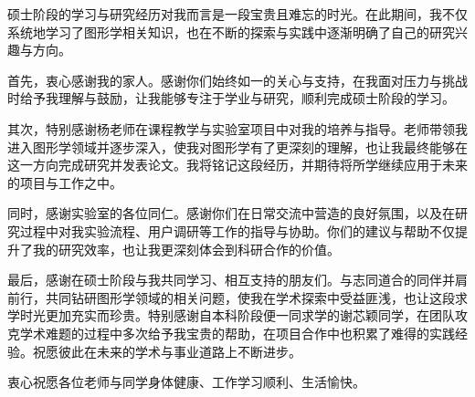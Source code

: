 
\begin{acknowledgements}
硕士阶段的学习与研究经历对我而言是一段宝贵且难忘的时光。在此期间，我不仅系统地学习了图形学相关知识，也在不断的探索与实践中逐渐明确了自己的研究兴趣与方向。

首先，衷心感谢我的家人。感谢你们始终如一的关心与支持，在我面对压力与挑战时给予我理解与鼓励，让我能够专注于学业与研究，顺利完成硕士阶段的学习。

其次，特别感谢杨老师在课程教学与实验室项目中对我的培养与指导。老师带领我进入图形学领域并逐步深入，使我对图形学有了更深刻的理解，也让我最终能够在这一方向完成研究并发表论文。我将铭记这段经历，并期待将所学继续应用于未来的项目与工作之中。

同时，感谢实验室的各位同仁。感谢你们在日常交流中营造的良好氛围，以及在研究过程中对我实验流程、用户调研等工作的指导与协助。你们的建议与帮助不仅提升了我的研究效率，也让我更深刻体会到科研合作的价值。

最后，感谢在硕士阶段与我共同学习、相互支持的朋友们。与志同道合的同伴并肩前行，共同钻研图形学领域的相关问题，使我在学术探索中受益匪浅，也让这段求学时光更加充实而珍贵。特别感谢自本科阶段便一同求学的谢芯颖同学，在团队攻克学术难题的过程中多次给予我宝贵的帮助，在项目合作中也积累了难得的实践经验。祝愿彼此在未来的学术与事业道路上不断进步。

衷心祝愿各位老师与同学身体健康、工作学习顺利、生活愉快。
\end{acknowledgements}

